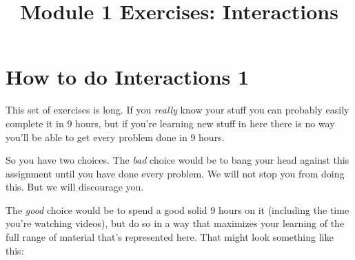 \documentclass{tufte-handout}
\title{Module 1 Exercises: Interactions}
\begin{document}
\maketitle

\vspace{0.1in}



\section{How to do Interactions 1}

This set of exercises is long.  If you {\it really} know your stuff you can probably easily complete it in 9 hours, but if you're learning new stuff in here there is no way you'll be able to get every problem done in 9 hours.

So you have two choices.  The {\it bad} choice would be to bang your head against this assignment until you have done every problem.  We will not stop you from doing this.  But we will discourage you.

The {\it good} choice would be to spend a good solid 9 hours on it (including the time you're watching videos), but do so in a way that maximizes your learning of the full range of material that's represented here.  That might look something like this:
\end{document}
